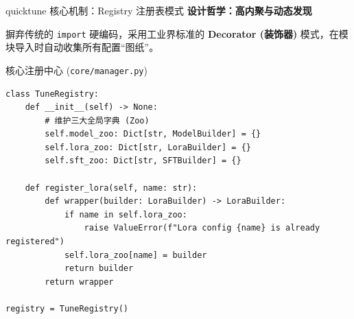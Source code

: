 \documentclass[aspectratio=169]{beamer}
\providecommand{\paragraph}[1]{\smallskip\textbf{#1}\par}
\begin{document}
\begin{frame}[fragile]{quicktune 核心机制：Registry 注册表模式}
  \paragraph{设计哲学：高内聚与动态发现}
  摒弃传统的 \texttt{import} 硬编码，采用工业界标准的 \textbf{Decorator (装饰器)} 模式，在模块导入时自动收集所有配置“图纸”。

  \begin{block}{核心注册中心 (\texttt{core/manager.py})}
\begin{verbatim}
class TuneRegistry:
    def __init__(self) -> None:
        # 维护三大全局字典 (Zoo)
        self.model_zoo: Dict[str, ModelBuilder] = {}
        self.lora_zoo: Dict[str, LoraBuilder] = {}
        self.sft_zoo: Dict[str, SFTBuilder] = {}

    def register_lora(self, name: str):
        def wrapper(builder: LoraBuilder) -> LoraBuilder:
            if name in self.lora_zoo:
                raise ValueError(f"Lora config {name} is already registered")
            self.lora_zoo[name] = builder
            return builder
        return wrapper

registry = TuneRegistry()
\end{verbatim}
  \end{block}
\end{frame}
\end{document}
